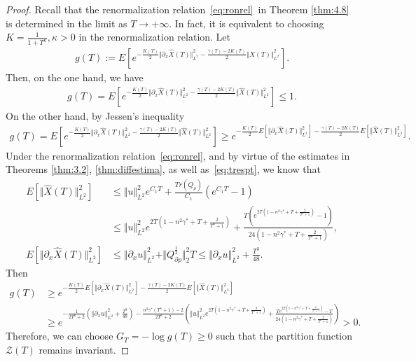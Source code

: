\documentclass[11pt]{article}
\numberwithin{equation}{section}%
\numberwithin{figure}{section}%
\theoremstyle{remark}
\begin{document}
	\begin{proof}
		Recall that the renormalization relation~\eqref{eq:ronrel}~in Theorem \ref{thm:4.8} is determined in the limit as $T\rightarrow+\infty$. In fact, it is equivalent to choosing 
		 $K=\frac{1}{1+T^{\kappa}},\kappa>0$ in the renormalization relation. Let
		 \begin{align*}
		 	g(T):=E[e^{-\frac{K(T)}{2}\Vert \partial_{x} \hat{X}(T)\Vert _{L^{2}}^{2}-\frac{\gamma(T)-2K(T)}{2}\Vert \hat{X}(T)\Vert _{L^{2}}^{2}}].
		 \end{align*}
		  Then, on the one hand, we have
		\begin{align*}
			g(T)=E[e^{-\frac{K(T)}{2}\Vert \partial_{x} \hat{X}(T)\Vert _{L^{2}}^{2}-\frac{\gamma(T)-2K(T)}{2}\Vert \hat{X}(T)\Vert _{L^{2}}^{2}}]\leq 1.
		\end{align*}
		On the other hand, by Jessen's inequality
		\begin{align*}
			g(T)=E[e^{-\frac{K(T)}{2}\Vert \partial_{x} \hat{X}(T)\Vert _{L^{2}}^{2}-\frac{\gamma(T)-2K(T)}{2}\Vert \hat{X}(T)\Vert _{L^{2}}^{2}}]\geq e^{-\frac{K(T)}{2}E[\Vert \partial_{x} \hat{X}(T)\Vert _{L^{2}}^{2}]-\frac{\gamma(T)-2K(T)}{2}E[\Vert \hat{X}(T)\Vert _{L^{2}}^{2}]}.
		\end{align*}
		Under the renormalization relation~\eqref{eq:ronrel}, and by virtue of the estimates in Theorems \ref{thm:3.2}, \ref{thm:diffestima}, as well as~\eqref{eq:trespt}, we know that 
		\begin{align*}
			E[\Vert \hat{X}(T) \Vert^{2}_{L^{2}}]&\leq\Vert u\Vert _{L^{2}}^{2}e^{C_{1}T}+\frac{Tr(Q_{\rho})}{C_{1}}(e^{C_{1}T}-1)\\
			&\leq\Vert u\Vert _{L^{2}}^{2}e^{2T(1-n^{2}\gamma^{*}+T+\frac{2}{T^{\kappa}+1})}+\frac{T(e^{2T(1-n^{2}\gamma^{*}+T+\frac{2}{T^{\kappa}+1})}-1)}{24(1-n^{2}\gamma^{*}+T+\frac{2}{T^{\kappa}+1})},\\
				E[\Vert\partial_{x} \hat{X}(T)\Vert _{L^{2}}^{2}]
				&\leq \Vert\partial_{x} u\Vert _{L^{2}}^{2}+\Vert Q_{\partial\rho}^{\frac{1}{2}}\Vert^{2}_{2}T\leq\Vert\partial_{x} u\Vert _{L^{2}}^{2}+\frac{T^{3}}{48}.
		\end{align*}
		Then
		\begin{align*}
			g(T)&\geq e^{-\frac{K(T)}{2}E[\Vert \partial_{x}\hat{X}(T)\Vert _{L^{2}}^{2}]-\frac{\gamma(T)-2K(T)}{2}E[\Vert \hat{X}(T)\Vert _{L^{2}}^{2}]}\\
			&\geq e^{-\frac{1}{2T^{\kappa}+2}\left(\Vert\partial_{x} u\Vert _{L^{2}}^{2}+\frac{T^{3}}{48}\right)-\frac{n^{2}\gamma^{*}(T^{\kappa}+1)-2}{2T^{\kappa}+2}\left(\Vert u\Vert _{L^{2}}^{2}e^{2T(1-n^{2}\gamma^{*}+T+\frac{2}{T^{\kappa}+1})}+\frac{Te^{2T(1-n^{2}\gamma^{*}+T+\frac{2}{T^{\kappa}+1})}-T}{24(1-n^{2}\gamma^{*}+T+\frac{2}{T^{\kappa}+1})}\right)}
			>0.
		\end{align*}
		Therefore, we can choose $G_{T}=-\log g(T)\geq 0$ such that the partition function $\mathcal{Z}(T)$ remains invariant.
	\end{proof}
	
\end{document}
